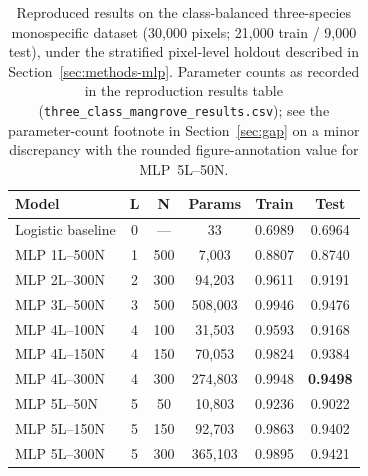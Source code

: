 \documentclass[10pt,twocolumn,a4paper]{article}
\begin{document}
\begin{table}[!t]
\centering
\caption{Reproduced results on the class-balanced three-species monospecific dataset
(30{,}000 pixels; 21{,}000 train / 9{,}000 test), under the stratified pixel-level holdout described
in Section~\ref{sec:methods-mlp}. Parameter counts as recorded in the reproduction results table
(\texttt{three\_class\_mangrove\_results.csv}); see the parameter-count footnote in Section~\ref{sec:gap} on a minor discrepancy
with the rounded figure-annotation value for MLP~5L--50N.}
\label{tab:ours}
\footnotesize
\setlength{\tabcolsep}{3.2pt}
\begin{tabular}{l c c c c c}
\toprule
\textbf{Model} & \textbf{L} & \textbf{N} & \textbf{Params} & \textbf{Train} & \textbf{Test} \\
\midrule
Logistic baseline & 0 & --- & 33 & 0.6989 & 0.6964 \\
MLP 1L--500N & 1 & 500 & 7{,}003 & 0.8807 & 0.8740 \\
MLP 2L--300N & 2 & 300 & 94{,}203 & 0.9611 & 0.9191 \\
MLP 3L--500N & 3 & 500 & 508{,}003 & 0.9946 & 0.9476 \\
MLP 4L--100N & 4 & 100 & 31{,}503 & 0.9593 & 0.9168 \\
MLP 4L--150N & 4 & 150 & 70{,}053 & 0.9824 & 0.9384 \\
MLP 4L--300N & 4 & 300 & 274{,}803 & 0.9948 & \textbf{0.9498} \\
MLP 5L--50N & 5 & 50 & 10{,}803 & 0.9236 & 0.9022 \\
MLP 5L--150N & 5 & 150 & 92{,}703 & 0.9863 & 0.9402 \\
MLP 5L--300N & 5 & 300 & 365{,}103 & 0.9895 & 0.9421 \\
\bottomrule
\end{tabular}
\end{table}
\end{document}
